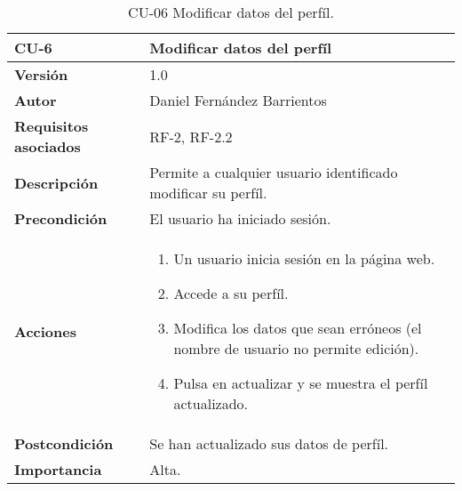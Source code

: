 \begin{table}[p]
	\centering
	\begin{tabularx}{\linewidth}{ p{} p{} }
		\toprule
		\textbf{CU-6}    & \textbf{Modificar datos del perfíl}\\
		\toprule
		\textbf{Versión}              & 1.0    \\
		\textbf{Autor}                & Daniel Fernández Barrientos \\
		\textbf{Requisitos asociados} & RF-2, RF-2.2 \\
		\textbf{Descripción}          & Permite a cualquier usuario identificado modificar su perfíl. \\
		\textbf{Precondición}         & El usuario ha iniciado sesión. \\
		\textbf{Acciones}             &
		\begin{enumerate}
			\def\labelenumi{\arabic{enumi}.}
			\tightlist
			\item Un usuario inicia sesión en la página web.
			\item Accede a su perfíl.
			\item Modifica los datos que sean erróneos (el nombre de usuario no permite edición).
			\item Pulsa en actualizar y se muestra el perfíl actualizado.
		\end{enumerate}\\
		\textbf{Postcondición}        & Se han actualizado sus datos de perfíl. \\
		\textbf{Importancia}          & Alta. \\
		\bottomrule
	\end{tabularx}
	\caption{CU-06 Modificar datos del perfíl.}
\end{table}

